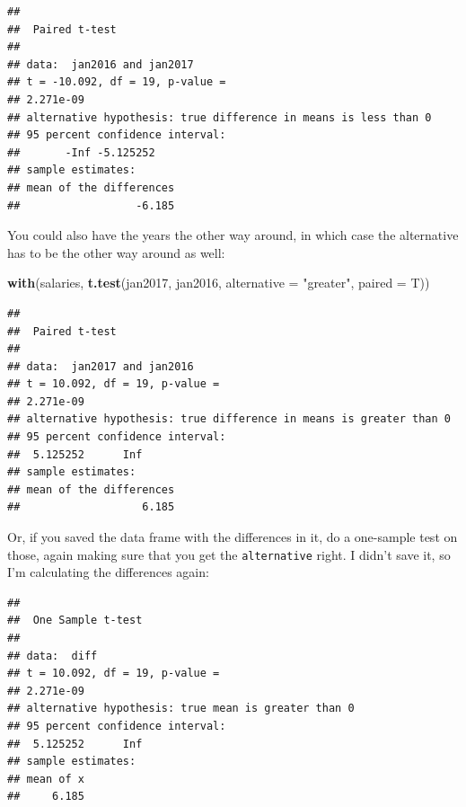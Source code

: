 \documentclass[]{tufte-book}
\newenvironment{Shaded}{}{}
\newcommand{\DataTypeTok}[1]{\textcolor[rgb]{0.56,0.13,0.00}{#1}}
\newcommand{\DecValTok}[1]{\textcolor[rgb]{0.25,0.63,0.44}{#1}}
\newcommand{\KeywordTok}[1]{\textcolor[rgb]{0.00,0.44,0.13}{\textbf{#1}}}
\newcommand{\NormalTok}[1]{#1}
\newcommand{\OperatorTok}[1]{\textcolor[rgb]{0.40,0.40,0.40}{#1}}
\newcommand{\StringTok}[1]{\textcolor[rgb]{0.25,0.44,0.63}{#1}}
\theoremstyle{definition}
\theoremstyle{definition}
\theoremstyle{definition}
\theoremstyle{remark}
\begin{document}
\begin{verbatim}
## 
##  Paired t-test
## 
## data:  jan2016 and jan2017
## t = -10.092, df = 19, p-value =
## 2.271e-09
## alternative hypothesis: true difference in means is less than 0
## 95 percent confidence interval:
##       -Inf -5.125252
## sample estimates:
## mean of the differences 
##                  -6.185
\end{verbatim}

You could also have the years the other way around, in which case the
alternative has to be the other way around as well:

\begin{Shaded}
\begin{Highlighting}[]
\KeywordTok{with}\NormalTok{(salaries, }\KeywordTok{t.test}\NormalTok{(jan2017, jan2016, }\DataTypeTok{alternative =} \StringTok{"greater"}\NormalTok{, }
    \DataTypeTok{paired =}\NormalTok{ T))}
\end{Highlighting}
\end{Shaded}

\begin{verbatim}
## 
##  Paired t-test
## 
## data:  jan2017 and jan2016
## t = 10.092, df = 19, p-value =
## 2.271e-09
## alternative hypothesis: true difference in means is greater than 0
## 95 percent confidence interval:
##  5.125252      Inf
## sample estimates:
## mean of the differences 
##                   6.185
\end{verbatim}

Or, if you saved the data frame with the differences in it, do a
one-sample test on those, again making sure that you get the
\texttt{alternative} right. I didn't save it, so I'm calculating the
differences again:

\begin{Shaded}
\end{Shaded}

\begin{verbatim}
## 
##  One Sample t-test
## 
## data:  diff
## t = 10.092, df = 19, p-value =
## 2.271e-09
## alternative hypothesis: true mean is greater than 0
## 95 percent confidence interval:
##  5.125252      Inf
## sample estimates:
## mean of x 
##     6.185
\end{verbatim}
\end{document}
